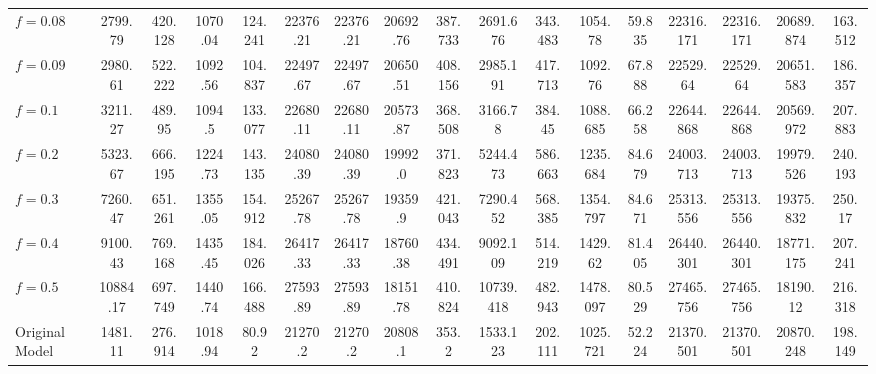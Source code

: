 \begin{tabular}{@{}lcccccccccccccccc@{}}
$f = 0.08$ & 2799.79 & 420.128 & 1070.04 & 124.241 & 22376.21 & 22376.21 & 20692.76 & 387.733 & 2691.676 & 343.483 & 1054.78 & 59.835 & 22316.171 & 22316.171 & 20689.874 & 163.512 \\
$f = 0.09$ & 2980.61 & 522.222 & 1092.56 & 104.837 & 22497.67 & 22497.67 & 20650.51 & 408.156 & 2985.191 & 417.713 & 1092.76 & 67.888 & 22529.64 & 22529.64 & 20651.583 & 186.357 \\
$f = 0.1$ & 3211.27 & 489.95 & 1094.5 & 133.077 & 22680.11 & 22680.11 & 20573.87 & 368.508 & 3166.78 & 384.45 & 1088.685 & 66.258 & 22644.868 & 22644.868 & 20569.972 & 207.883 \\
$f = 0.2$ & 5323.67 & 666.195 & 1224.73 & 143.135 & 24080.39 & 24080.39 & 19992.0 & 371.823 & 5244.473 & 586.663 & 1235.684 & 84.679 & 24003.713 & 24003.713 & 19979.526 & 240.193 \\
$f = 0.3$ & 7260.47 & 651.261 & 1355.05 & 154.912 & 25267.78 & 25267.78 & 19359.9 & 421.043 & 7290.452 & 568.385 & 1354.797 & 84.671 & 25313.556 & 25313.556 & 19375.832 & 250.17 \\
$f = 0.4$ & 9100.43 & 769.168 & 1435.45 & 184.026 & 26417.33 & 26417.33 & 18760.38 & 434.491 & 9092.109 & 514.219 & 1429.62 & 81.405 & 26440.301 & 26440.301 & 18771.175 & 207.241 \\
$f = 0.5$ & 10884.17 & 697.749 & 1440.74 & 166.488 & 27593.89 & 27593.89 & 18151.78 & 410.824 & 10739.418 & 482.943 & 1478.097 & 80.529 & 27465.756 & 27465.756 & 18190.12 & 216.318 \\
Original Model & 1481.11 & 276.914 & 1018.94 & 80.92 & 21270.2 & 21270.2 & 20808.1 & 353.2 & 1533.123 & 202.111 & 1025.721 & 52.224 & 21370.501 & 21370.501 & 20870.248 & 198.149 \\
\bottomrule
\end{tabular}

